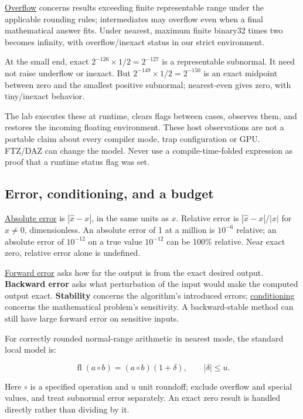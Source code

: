 \hyperref[appendix-ed8531b46754]{Overflow} concerns results exceeding finite representable range under the applicable rounding rules; intermediates may overflow even when a final mathematical answer fits. Under nearest, maximum finite binary32 times two becomes infinity, with overflow/inexact status in our strict environment.

At the small end, exact \(2^{-126}\times1/2=2^{-127}\) is a representable subnormal. It need not raise underflow or inexact. But \(2^{-149}\times1/2=2^{-150}\) is an exact midpoint between zero and the smallest positive subnormal; nearest-even gives zero, with tiny/inexact behavior.

The lab executes these at runtime, clears flags between cases, observes them, and restores the incoming floating environment. These host observations are not a portable claim about every compiler mode, trap configuration or GPU. FTZ/DAZ can change the model. Never use a compile-time-folded expression as proof that a runtime status flag was set.

\subsection{Error, conditioning, and a budget}\label{01-foundations-i-ch001-error-conditioning-and-a-budget}

\hyperref[appendix-3ae74e89b4e6]{Absolute error} is \(|\widehat x-x|\), in the same units as \(x\). Relative error is \(|\widehat x-x|/|x|\) for \(x\ne0\), dimensionless. An absolute error of 1 at a million is \(10^{-6}\) relative; an absolute error of \(10^{-12}\) on a true value \(10^{-12}\) can be 100\% relative. Near exact zero, relative error alone is undefined.

\hyperref[appendix-a7fbaf6d1b1c]{Forward error} asks how far the output is from the exact desired output. \textbf{Backward error} asks what perturbation of the input would make the computed output exact. \textbf{Stability} concerns the algorithm's introduced errors; \hyperref[appendix-8f6a01f284a7]{conditioning} concerns the mathematical problem's sensitivity. A backward-stable method can still have large forward error on sensitive inputs.

For correctly rounded normal-range arithmetic in nearest mode, the standard local model is:

\[
\operatorname{fl}(a\circ b)=(a\circ b)(1+\delta),\qquad |\delta|\le u.
\]

Here \(\circ\) is a specified operation and \(u\) unit roundoff; exclude overflow and special values, and treat subnormal error separately. An exact zero result is handled directly rather than dividing by it.

